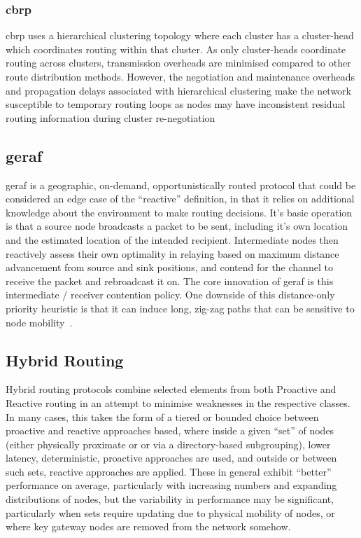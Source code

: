 \subsubsection{\gls{cbrp}}
\gls{cbrp} uses a hierarchical clustering topology where each cluster has a cluster-head which coordinates routing within that cluster. As only cluster-heads coordinate routing across clusters, transmission overheads are minimised compared to other route distribution methods. However, the negotiation and maintenance overheads and propagation delays associated with hierarchical clustering make the network susceptible to temporary routing loops as nodes may have inconsistent residual routing information during cluster re-negotiation\\
\subsection{\gls{geraf}}
\gls{geraf} is a geographic, on-demand, opportunistically routed protocol that could be considered an edge case of the ``reactive'' definition, in that it relies on additional knowledge about the environment to make routing decisions.
It's basic operation is that a source node broadcasts a packet to be sent, including it's own location and the estimated location of the intended recipient.
Intermediate nodes then reactively assess their own optimality in relaying based on maximum distance advancement from source and sink positions, and contend for the channel to receive the packet and rebroadcast it on.
The core innovation of \gls{geraf} is this intermediate / receiver contention policy\cite{Zorzi2003,Zorzi2003a}.
One downside of this distance-only priority heuristic is that it can induce long, zig-zag paths that can be sensitive to node mobility~\cite{Jornet2008}.

\subsection{Hybrid Routing}

Hybrid routing protocols combine selected elements from both Proactive and Reactive routing  in an attempt to minimise weaknesses in the respective classes.
In many cases, this takes the form of a tiered or bounded choice between proactive and reactive approaches based, where inside a given ``set'' of nodes (either physically proximate or or via a directory-based subgrouping), lower latency, deterministic, proactive approaches are used, and outside or between such sets, reactive approaches are applied.
These in general exhibit ``better'' performance on average, particularly with increasing numbers and expanding distributions of nodes, but the variability in performance may be significant, particularly when sets require updating due to physical mobility of nodes, or where key gateway nodes are removed from the network somehow. 

